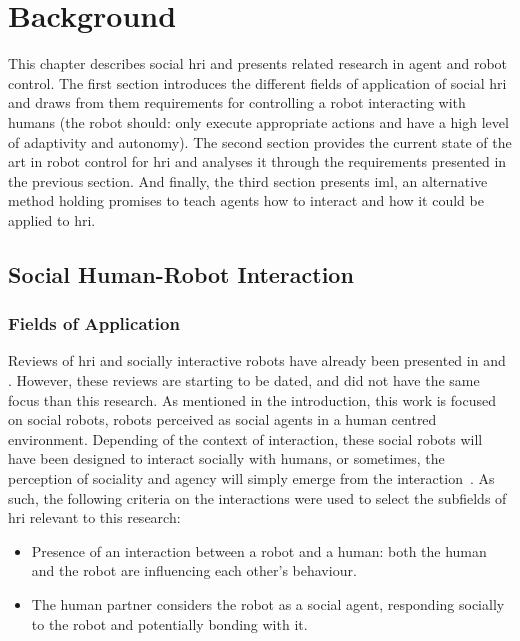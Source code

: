 \chapter{Background} \label{chap:background}
\glsresetall

This chapter describes social \gls{hri} and presents related research in agent and robot control. The first section introduces the different fields of application of social \gls{hri} and draws from them requirements for controlling a robot interacting with humans (the robot should: only execute appropriate actions and have a high level of adaptivity and autonomy). The second section provides the current state of the art in robot control for \gls{hri} and analyses it through the requirements presented in the previous section. And finally, the third section presents \gls{iml}, an alternative method holding promises to teach agents how to interact and how it could be applied to \gls{hri}.

\section{Social Human-Robot Interaction}

\subsection{Fields of Application} \label{ssec:back_hri}
Reviews of \gls{hri} and socially interactive robots have already been presented in \cite{goodrich2007human} and \cite{fong2003survey}. However, these reviews are starting to be dated, and did not have the same focus than this research. As mentioned in the introduction, this work is focused on social robots, robots perceived as social agents in a human centred environment. Depending of the context of interaction, these social robots will have been designed to interact socially with humans, or sometimes, the perception of sociality and agency will simply emerge from the interaction~\citep{fincannon2004evidence}. As such, the following criteria on the interactions were used to select the subfields of \gls{hri} relevant to this research:
\begin{itemize}
	\item Presence of an interaction between a robot and a human: both the human and the robot are influencing each other's behaviour.
	\item The human partner considers the robot as a social agent, responding socially to the robot and potentially bonding with it.
\end{itemize}

